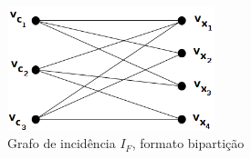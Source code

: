 \begin{figure}[htb]	
\center%
\includegraphics[width=6cm]{./img/grafoIncidencia2apex.png}
\caption{Grafo de incidência $I_F$, formato bipartição }
\label{fig:grafoIncidencia2apex}
\end{figure}